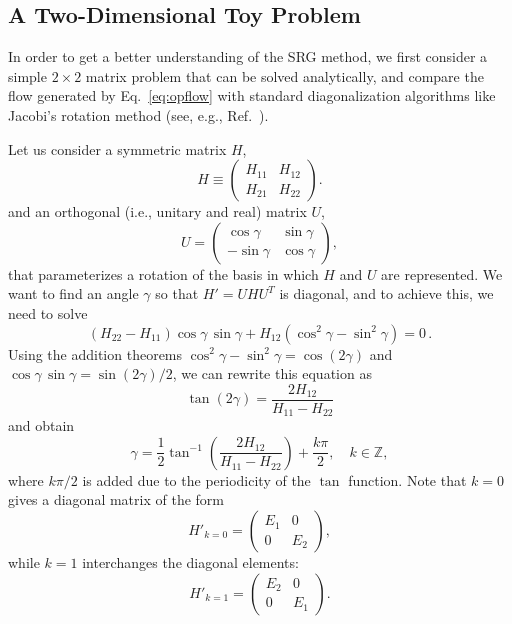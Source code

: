 \subsection{\label{sec:srg_toy}A Two-Dimensional Toy Problem}

In order to get a better understanding of the SRG method, we first consider  
a simple $2\times 2$ matrix problem that can be solved analytically, and 
compare the flow generated by Eq.~\eqref{eq:opflow} with standard 
diagonalization algorithms like Jacobi's rotation method (see, e.g., 
Ref.~\cite{Golub:2013le}).

Let us consider a symmetric matrix $H$, 
\begin{equation} 
  H \equiv \begin{pmatrix} H_{11} & H_{12} \\ H_{21} & H_{22}\end{pmatrix}. 
\end{equation}
and an orthogonal (i.e., unitary and real) matrix $U$,
\begin{equation}
  U = \begin{pmatrix} \cos\gamma & \sin\gamma \\ -\sin\gamma & \cos\gamma \end{pmatrix}, 
\end{equation}
that parameterizes a rotation of the basis in which $H$ and $U$ are
represented. We want to find an angle $\gamma$ so that $H' = UHU^T$ is diagonal, 
and to achieve this, we need to solve
\begin{equation}
(H_{22} - H_{11})\cos\gamma\,\sin\gamma + H_{12}(\cos^2\gamma - \sin^2\gamma) = 0\,.
\end{equation}
Using the addition theorems $\cos^2\gamma-\sin^2\gamma = \cos(2\gamma)$ and 
$\cos\gamma\,\sin\gamma = \sin(2\gamma)/2$, we can rewrite this equation as
\begin{equation}
  \tan(2\gamma) = \frac{2 H_{12}}{H_{11}-H_{22}}
\end{equation}
and obtain
\begin{equation} 
\gamma = \frac{1}{2} \tan^{-1} \left( \frac{2H_{12}}{H_{11}-H_{22}}
\right) + \frac{k\pi}{2}, \quad k \in \mathbb{Z}, \label{eq:0} 
\end{equation}
where $k\pi/2$ is added due to the periodicity of the $\tan$ function.
Note that  $k=0$ gives a diagonal matrix of the form
\begin{equation} 
H'_{k=0} = \begin{pmatrix} E_1 & 0 \\ 0 & E_2 \end{pmatrix},
\label{eq:1} 
\end{equation}
while  $k=1$ interchanges the diagonal elements:  
\begin{equation} 
H'_{k=1} = \begin{pmatrix} E_2 & 0 \\ 0 & E_1 \end{pmatrix}.
\label{eq:2}
\end{equation}

